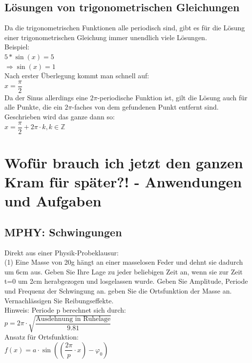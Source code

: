 \documentclass[11pt,final]{scrreprt}
\newcommand{\Z} {\mathbb Z}
\begin{document}
\subsection{Lösungen von trigonometrischen Gleichungen}
Da die trigonometrischen Funktionen alle periodisch sind, gibt es für die Lösung einer trigonometrischen Gleichung immer unendlich viele Lösungen.\\
Beispiel:\\
$ 5*\sin(x) = 5$\\
$ \Rightarrow \sin(x) = 1 $\\
Nach erster Überlegung kommt man schnell auf: \\
$ x = \dfrac{\pi}{2} $\\
Da der Sinus allerdings eine $2\pi$-periodische Funktion ist, gilt die Lösung auch für alle Punkte, die ein $2\pi$-faches von dem gefundenen Punkt entfernt sind. Geschrieben wird das ganze dann so:\\
$ x = \dfrac{\pi}{2} + 2\pi\cdot k, k\in\Z $\\

\newpage
\section{Wofür brauch ich jetzt den ganzen Kram für später?! - Anwendungen und Aufgaben}

\subsection{MPHY: Schwingungen}

Direkt aus einer Physik-Probeklausur:\\

(1) Eine Masse von 20g hängt an einer masselosen Feder und dehnt sie dadurch um 6cm aus. Geben Sie Ihre Lage zu jeder beliebigen Zeit an, wenn sie zur Zeit t=0 um 2cm herabgezogen und losgelassen wurde. Geben Sie Amplitude, Periode und Frequenz der Schwingung an. geben Sie die Ortsfunktion der Masse an. Vernachlässigen Sie Reibungseffekte.\\

Hinweis: Periode p berechnet sich durch:\\
$ p= 2\pi\cdot\sqrt{\dfrac{\text{Ausdehnung in Ruhelage}}{9.81}} $\\

Ansatz für Ortsfunktion:\\
$ f(x) = a \cdot \sin((\dfrac{2\pi}{p}\cdot x)-\varphi_0) $\\
\end{document}
